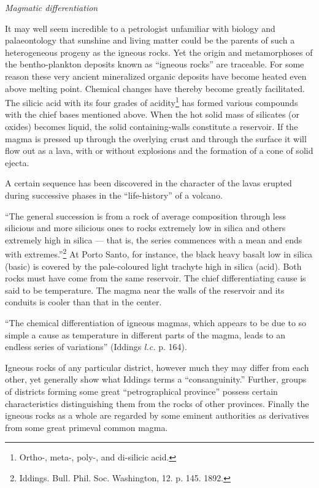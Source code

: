 \documentclass[a4paper, 12pt, oneside]{article}
\begin{document}
\bigskip
\centerline{\emph{Magmatic differentiation}}

It may well seem incredible to a petrologist unfamiliar with biology and palaeontology that sunshine and living matter could be the parents of such a heterogeneous progeny as the igneous rocks. Yet the origin and metamorphoses of the bentho-plankton deposits known as ``igneous rocks'' are traceable. For some reason these very ancient mineralized organic deposits have become heated even above melting point. Chemical changes have thereby become greatly facilitated. The silicic acid with its four grades of acidity\footnote{Ortho-, meta-, poly-, and di-silicic acid.} has formed various compounds with the chief bases mentioned above. When the hot solid mass of silicates (or oxides) becomes liquid, the solid containing-walls constitute a reservoir. If the magma is pressed up through the overlying crust and through the surface it will flow out as a lava, with or without explosions and the formation of a cone of solid ejecta.

A certain sequence has been discovered in the character of the lavas erupted during successive phases in the ``life-history'' of a volcano.

``The general succession is from a rock of average composition through less silicious and more silicious ones to rocks extremely low in silica and others extremely high in silica --- that is, the series commences with a mean and ends with extremes.''\footnote{Iddings. Bull. Phil. Soc. Washington, 12. p. 145. 1892.} At Porto Santo, for instance, the black heavy basalt low in silica (basic) is covered by the pale-coloured light trachyte high in silica (acid). Both rocks must have come from the same reservoir. The chief differentiating cause is said to be temperature. The magma near the walls of the reservoir and its conduits is cooler than that in the center.

``The chemical differentiation of igneous magmas, which appears to be due to so simple a cause as temperature in different parts of the magma, leads to an endless series of variations'' (Iddings \emph{l.c.} p. 164).

Igneous rocks of any particular district, however much they may differ from each other, yet generally show what Iddings terms a ``consanguinity.'' Further, groups of districts forming some great ``petrographical province'' possess certain characteristics distinguishing them from the rocks of other provinces. Finally the igneous rocks as a whole are regarded by some eminent authorities as derivatives from some great primeval common magma.
\end{document}
